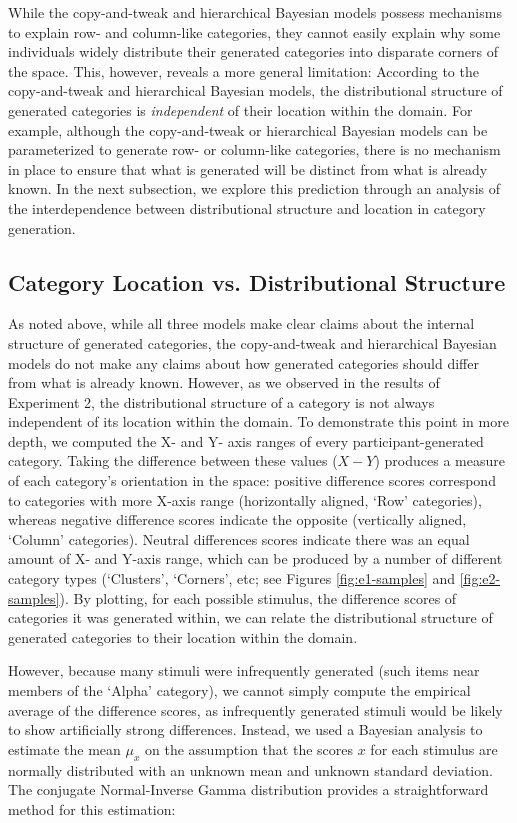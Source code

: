 \documentclass[12pt]{article}
\begin{document}
\begin{flushleft}
While the copy-and-tweak and hierarchical Bayesian models possess mechanisms to
explain row- and column-like categories, they cannot easily explain why some
individuals widely distribute their generated categories into disparate corners
of the space. This, however, reveals a more general limitation: According to the
copy-and-tweak and hierarchical Bayesian models, the distributional structure of
generated categories is {\em independent} of their location within the domain.
For example, although the copy-and-tweak or hierarchical Bayesian models can be
parameterized to generate row- or column-like categories, there is no mechanism
in place to ensure that what is generated will be distinct from what is already
known. In the next subsection, we explore this prediction through an analysis of
the interdependence between distributional structure and location in category
generation.

\subsection{Category Location vs. Distributional Structure}
\label{section:individual-diff}
As noted above, while all three models make clear claims about the internal
structure of generated categories, the copy-and-tweak and hierarchical Bayesian
models do not make any claims about how generated categories should differ from
what is already known. However, as we observed in the results of Experiment 2,
the distributional structure of a category is not always independent of its
location within the domain. To demonstrate this point in more depth, we computed
the X- and Y- axis ranges of every participant-generated category. Taking the
difference between these values ($X-Y$) produces a measure of each category's
orientation in the space: positive difference scores correspond to categories
with more X-axis range (horizontally aligned, `Row' categories), whereas
negative difference scores indicate the opposite (vertically aligned, `Column'
categories). Neutral differences scores indicate there was an equal amount of X-
and Y-axis range, which can be produced by a number of different category types
(`Clusters', `Corners', etc; see Figures \ref{fig:e1-samples} and
\ref{fig:e2-samples}). By plotting, for each possible stimulus, the difference
scores of categories it was generated within, we can relate the distributional
structure of generated categories to their location within the domain.

However, because many stimuli were infrequently generated (such items near
members of the `Alpha' category), we cannot simply compute the empirical average
of the difference scores, as infrequently generated stimuli would be likely to
show artificially strong differences. Instead, we used a Bayesian analysis to
estimate the mean $\mu_x$ on the assumption that the scores $x$ for each
stimulus are normally distributed with an unknown mean and unknown standard
deviation. The conjugate Normal-Inverse Gamma distribution provides a
straightforward method for this estimation:



\end{flushleft}
\end{document}
